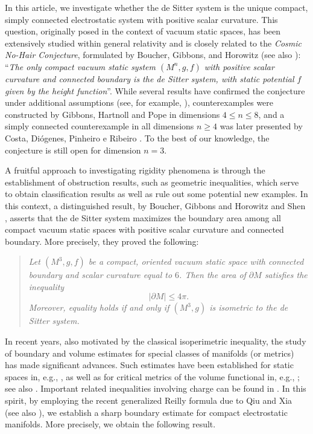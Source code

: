 \documentclass{amsart}
\numberwithin{equation}{section}
\begin{document}
	

In this article, we investigate whether the de Sitter system is the unique compact, simply connected electrostatic system with positive scalar curvature. This question, originally posed in the context of vacuum static spaces, has been extensively studied within general relativity and is closely related to the {\it Cosmic No-Hair Conjecture}, formulated by Boucher, Gibbons, and Horowitz \cite{boucher1} (see also \cite{boucher}):  ``{\it The only compact vacuum static system \((M^n, g, f)\) with positive scalar curvature and connected boundary is the de Sitter system, with static potential \(f\) given by the height function}''. While several results have confirmed the conjecture under additional assumptions (see, for example, \cite{ambrozio,bouch,boucher1,fried,HY,koba, laf,reilly}), counterexamples were constructed by Gibbons, Hartnoll and Pope \cite{ghp} in dimensions \( 4 \leq n \leq 8 \), and a simply connected counterexample in all dimensions \( n \geq 4 \) was later presented by Costa, Di\'ogenes, Pinheiro e Ribeiro \cite{costa}. To the best of our knowledge, the conjecture is still open for dimension \( n = 3 \). 


A fruitful approach to investigating rigidity phenomena is through the establishment of obstruction results, such as geometric inequalities, which serve to obtain classification results as well as rule out some potential new examples. In this context, a distinguished result, by Boucher, Gibbons and Horowitz \cite{boucher1} and Shen \cite{sh}, asserts that the de Sitter system maximizes the boundary area among all compact vacuum static spaces with positive scalar curvature and connected boundary. More precisely, they proved the following:


\begin{quote}
\textit{Let \((M^3, g, f)\) be a compact, oriented vacuum static space with connected boundary and scalar curvature equal to \(6\). Then the area of \(\partial M\) satisfies the inequality
\[
|\partial M| \leq 4\pi.
\]
Moreover, equality holds if and only if \((M^3, g)\) is isometric to the de Sitter system.}
\end{quote} In recent years, also motivated by the classical isoperimetric inequality, the study of boun\-dary and volume estimates for special classes of manifolds (or metrics) has made significant advances. Such estimates have been established for static spaces in, e.g., \cite{ambrozio,BMaz,costa,HMR}, as well as for critical metrics of the volume functional in, e.g., \cite{BDR1,BLF,BSilva,Batista,CEM,FY,Y2023}; see also \cite{ernani,ernani2}. Important related inequalities involving charge can be found in \cite{Jaracz,MKhuri}. In this spirit, by employing the recent genera\-lized Reilly formula due to Qiu and Xia \cite{qiu} (see also \cite{LiXia}), we establish a sharp boundary estimate for compact electrostatic manifolds. More precisely, we obtain the following result. 
\end{document}
